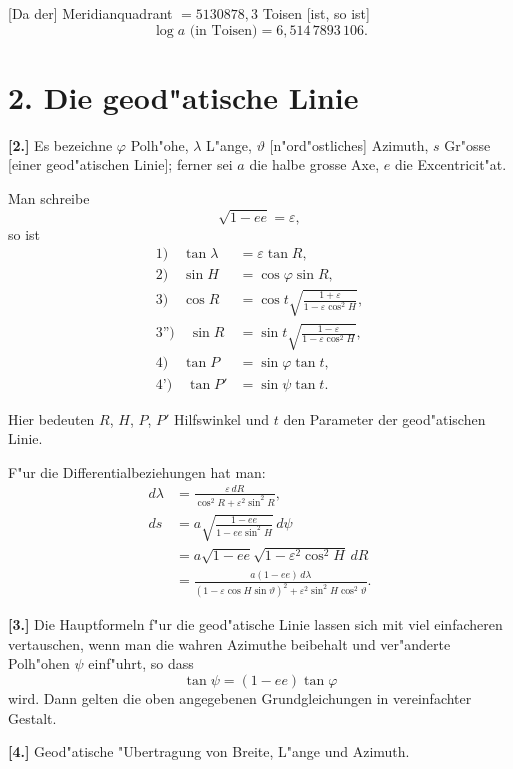 \documentclass[12pt,a4paper]{article}
\theoremstyle{plain}
\theoremstyle{definition}
\theoremstyle{remark}
\begin{document}
[Da der] Meridianquadrant $= 5130878{,}3$ Toisen [ist, so ist]
\[
\log a \text{ (in Toisen)} = 6{,}514\,7893\,106.
\]

\section*{2. Die geod"atische Linie}

\textbf{[2.]} Es bezeichne $\varphi$ Polh"ohe, $\lambda$ L"ange, $\vartheta$ [n"ord"ostliches] Azimuth, $s$ Gr"osse [einer geod"atischen Linie]; ferner sei $a$ die halbe grosse Axe, $e$ die Excentricit"at.

Man schreibe
\[
\sqrt{1 - ee} = \varepsilon,
\]
so ist
\begin{align*}
\text{1)}\quad \tan\lambda &= \varepsilon \tan R, \\
\text{2)}\quad \sin H &= \cos\varphi \sin R, \\
\text{3)}\quad \cos R &= \cos t \sqrt{\tfrac{1 + \varepsilon}{1 - \varepsilon\cos^2 H}}, \\
\text{3'')}\quad \sin R &= \sin t \sqrt{\tfrac{1 - \varepsilon}{1 - \varepsilon\cos^2 H}}, \\
\text{4)}\quad \tan P &= \sin\varphi \tan t, \\
\text{4')}\quad \tan P' &= \sin\psi \tan t.
\end{align*}

Hier bedeuten $R$, $H$, $P$, $P'$ Hilfswinkel und $t$ den Parameter der
geod"atischen Linie.

F"ur die Differentialbeziehungen hat man:
\begin{align*}
d\lambda &= \frac{\varepsilon\,dR}{\cos^2 R + \varepsilon^2\sin^2 R}, \\
ds &= a\sqrt{\tfrac{1 - ee}{1 - ee\sin^2 H}}\,d\psi \\
&= a\sqrt{1 - ee}\sqrt{1 - \varepsilon^2\cos^2 H}\,dR \\
&= \frac{a(1 - ee)\,d\lambda}{(1 - \varepsilon\cos H\sin\vartheta)^2 + \varepsilon^2\sin^2 H\cos^2\vartheta}.
\end{align*}

\textbf{[3.]} Die Hauptformeln f"ur die geod"atische Linie lassen sich mit viel einfacheren vertauschen, wenn man die wahren Azimuthe beibehalt und ver"anderte Polh"ohen $\psi$ einf"uhrt, so dass
\[
\tan\psi = (1 - ee) \tan\varphi
\]
wird. Dann gelten die oben angegebenen Grundgleichungen in vereinfachter
Gestalt.

\textbf{[4.]} Geod"atische "Ubertragung von Breite, L"ange und Azimuth.
\end{document}
